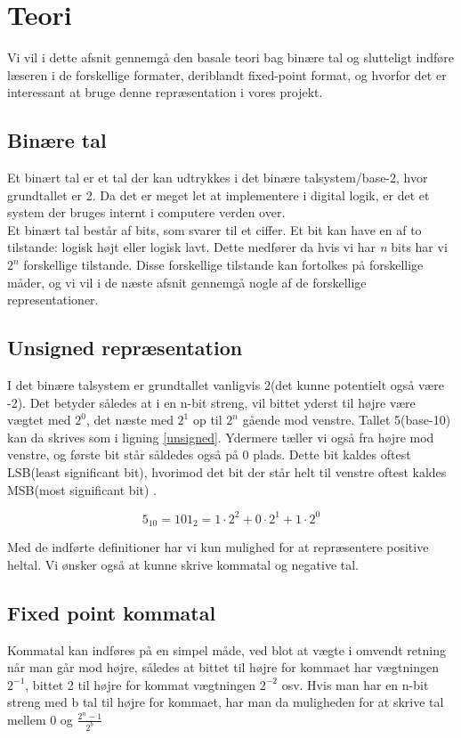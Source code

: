 \section{Teori}

Vi vil i dette afsnit gennemgå den basale teori bag binære tal og slutteligt indføre læseren i de forskellige formater, deriblandt fixed-point format, og hvorfor det er interessant at bruge denne repræsentation  i vores projekt.
\subsection{Binære tal}
Et binært tal er et tal der kan udtrykkes i det binære talsystem/base-2, hvor grundtallet er 2. Da det er meget let at implementere i digital logik, er det et system der bruges internt i computere verden over. \\ 
Et binært tal består af bits, som svarer til et ciffer. Et bit kan have en af to tilstande: logisk højt eller logisk lavt. Dette medfører da hvis vi har \textit{n} bits har vi $2^n$ forskellige tilstande. Disse forskellige tilstande kan fortolkes på forskellige måder, og vi vil i de næste afsnit gennemgå nogle af de forskellige representationer.
\subsection{Unsigned repræsentation}
I det binære talsystem er grundtallet vanligvis 2(det kunne potentielt også være -2). Det betyder således at i en n-bit streng, vil  bittet yderst til højre være vægtet med  $2^0$, det næste med $2^1$ op til $2^n$ gående mod venstre. Tallet 5(base-10) kan da skrives som i ligning \ref{unsigned}. Ydermere tæller vi også fra højre mod venstre, og første bit står såldedes også på 0 plads. Dette bit kaldes oftest  LSB(least significant bit), hvorimod det bit der står helt til venstre oftest kaldes MSB(most significant bit) \cite[s. 18]{Dlogic}. 


\begin{equation}\label{unsigned}
5_{10} = 101_{2} = 1 \cdot 2^2+0 \cdot 2^1+1 \cdot 2^0
\end{equation}


Med de indførte definitioner har vi kun mulighed for at repræsentere positive heltal. Vi ønsker også at kunne skrive kommatal og negative tal.

\subsection{Fixed point kommatal}
Kommatal kan indføres på en simpel måde, ved blot at vægte i omvendt retning når man går mod højre, således at bittet til højre for kommaet har vægtningen $2^{-1}$, bittet 2 til højre for kommat vægtningen $2^{-2}$ osv. Hvis man har en n-bit streng med b tal til højre for kommaet, har man da muligheden for at skrive tal mellem 0 og $\frac{2^n-1}{2^b}$ \cite[s.~4]{Yates}

